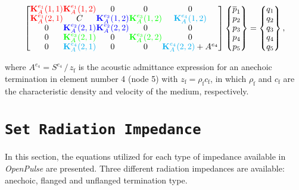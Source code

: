 \documentclass[12pt]{article}
\begin{document}
\begin{equation} \label{eq:global_mobility_matrix_BC3}
	\setlength{\arraycolsep}{0.1pt}
	\renewcommand{\arraystretch}{0.95}
	\begin{bmatrix}
		\textcolor{red}{\mathbf{K}_{A}^{e_1}(1,1)} & \textcolor{red}{\mathbf{K}_{A}^{e_1}(1,2)} & 0 & 0 & 0 \\
		\textcolor{red}{\mathbf{K}_{A}^{e_1}(2,1)}  & C & \textcolor{blue}{\mathbf{K}_{A}^{e_2}(1,2)} & \textcolor{green}{\mathbf{K}_{A}^{e_3}(1,2)} & \textcolor{cyan}{\mathbf{K}_{A}^{e_4}(1,2)} \\
		0   &   \textcolor{blue}{\mathbf{K}_{A}^{e_2}(2,1)}   &   \textcolor{blue}{\mathbf{K}_{A}^{e_2}(2,2)}   & 0 & 0 \\
		0   &   \textcolor{green}{\mathbf{K}_{A}^{e_3}(2,1)}   &   0   &  \textcolor{green}{\mathbf{K}_{A}^{e_3}(2,2)}  &   0 \\
		0   &   \textcolor{cyan}{\mathbf{K}_{A}^{e_4}(2,1)}   &   0   &   0   &   \textcolor{cyan}{\mathbf{K}_{A}^{e_4}(2,2)} + A^{e_4}
	\end{bmatrix}
	\begin{Bmatrix}
		\overline{p}_1 \\
		p_2 \\
		p_3 \\
		p_4 \\
		p_5 \\
	\end{Bmatrix}
	=
	\begin{Bmatrix}
		q_1 \\
		q_2 \\
		q_3 \\
		q_4 \\
		q_5 \\
	\end{Bmatrix},
\end{equation}

\noindent where $A^{e_4} = S^{e_4} \, / \, z_{\text{f}} $ is the acoustic admittance expression for an anechoic termination in element number 4 (node 5) with $z_{\text{f}} = \rho_{\text{f}} c_{\text{f}}$, in which $\rho_{\text{f}}$ and $c_{\text{f}}$ are  the characteristic density and velocity of the medium, respectively.

\section{\texttt{Set Radiation Impedance}}

In this section, the equations utilized for each type of impedance available in \textit{OpenPulse} are presented. Three different radiation impedances are available: anechoic, flanged and unflanged termination type.
\end{document}
